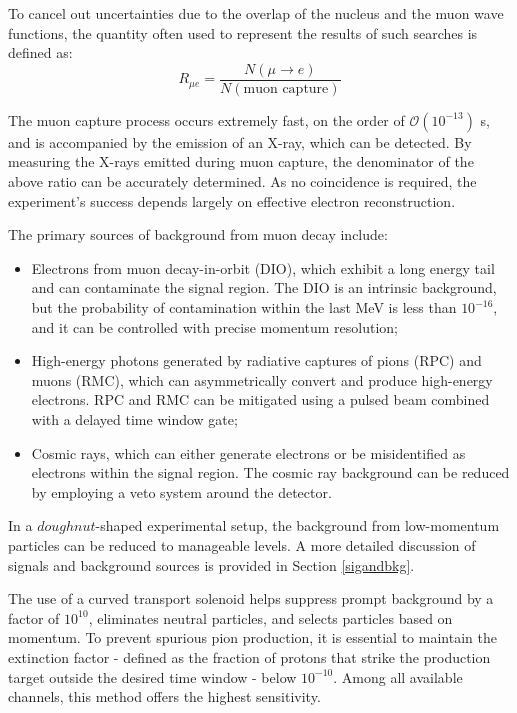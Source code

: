 To cancel out uncertainties due to the overlap of the 
nucleus and the muon wave functions, the quantity often 
used to represent the results of such searches is defined as: 
\begin{equation} 
  R_{\mu e} = \frac{N(\mu \rightarrow e)}{N(\text{muon capture})} 
\end{equation} 

The muon capture process occurs extremely fast, 
on the order of $\mathcal{O}(10^{-13})$ s, and is 
accompanied by the emission of an X-ray, which can be detected. 
By measuring the X-rays emitted during muon capture, the denominator of 
the above ratio can be accurately determined. As no coincidence 
is required, the experiment's success depends largely on effective electron reconstruction.

The primary sources of background from muon decay include: 
\begin{itemize} 
  \item Electrons from muon decay-in-orbit (DIO), which exhibit a 
  long energy tail and can contaminate the signal region. 
  The DIO is an intrinsic background, but the probability of 
  contamination within the last MeV is less than $10^{-16}$, 
  and it can be controlled with precise momentum resolution; 
  \item High-energy photons generated by radiative captures of pions (RPC) 
  and muons (RMC), which can asymmetrically convert and produce high-energy 
  electrons. RPC and RMC can be mitigated using a pulsed beam combined with a delayed 
  time window gate; 
  \item Cosmic rays, which can either generate electrons or be misidentified as 
  electrons within the signal region. The cosmic ray background can be reduced 
  by employing a veto system around the detector. 
\end{itemize}

In a $doughnut$-shaped experimental setup, the background 
from low-momentum particles can be reduced to manageable levels.
A more detailed discussion of signals and background sources is provided in Section \ref{sigandbkg}.

The use of a curved transport solenoid helps suppress 
prompt background by a factor of $10^{10}$, eliminates 
neutral particles, and selects particles based on momentum. 
To prevent spurious pion production, it is essential to maintain the 
extinction factor - defined as the fraction of protons that strike the 
production target outside the desired time window - below $10^{-10}$. 
Among all available channels, this method offers the highest sensitivity.

